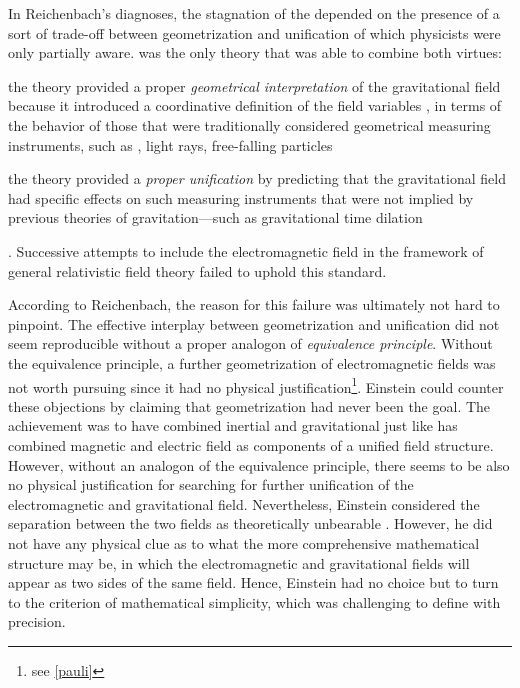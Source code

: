 \documentclass[final]{article}
\begin{document}
In Reichenbach's diagnoses, the stagnation of the \uftp depended on the presence of a sort of trade-off between geometrization and unification of which physicists were only partially aware. \Gr was the only theory that was able to combine both virtues: \begin{inparaenum}[(1)] \item the theory provided a proper \emph{geometrical interpretation} of the gravitational field because it introduced a coordinative definition of the field variables \gmn, in terms of the behavior of those that were traditionally considered geometrical measuring instruments, such as \rac, light rays, free-falling particles \item the theory provided a \emph{proper unification} by predicting that the gravitational field had specific effects on such measuring instruments that were not implied by previous theories of gravitation---such as gravitational time dilation \end{inparaenum} \citep[378]{Reichenbach1928}. Successive attempts to include the electromagnetic field in the framework of general relativistic field theory failed to uphold this standard. 


According to Reichenbach, the reason for this failure was ultimately not hard to pinpoint. The effective interplay between geometrization and unification did not seem reproducible without a proper analogon of \emph{equivalence principle}. Without the equivalence principle, a further geometrization of electromagnetic fields was not worth pursuing since it had no physical justification\footnote{see \cref{pauli}}. Einstein could counter these objections by claiming that geometrization had never been the goal. The achievement \gr was to have combined inertial and gravitational just like \sr has combined magnetic and electric field as components of a unified field structure. However, without an analogon of the equivalence principle, there seems to be also no physical justification for searching for further unification of the electromagnetic and gravitational field. Nevertheless, Einstein considered the separation between the two fields as theoretically unbearable \citep[24]{Einstein1930i}. However, he did not have any physical clue as to what the more comprehensive mathematical structure may be, in which the electromagnetic and gravitational fields will appear as two sides of the same field. Hence, Einstein had no choice but to turn to the criterion of mathematical simplicity, which was challenging to define with precision.
\end{document}

